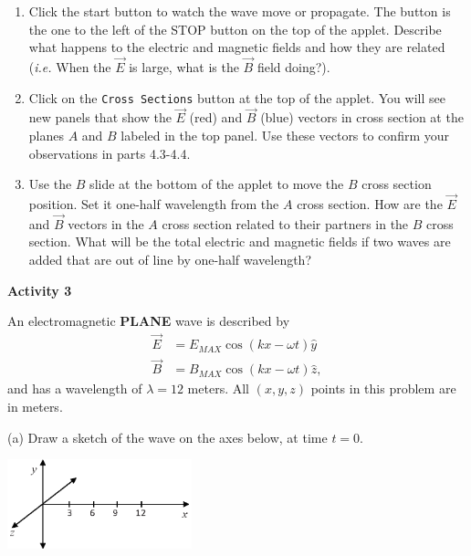 \begin{enumerate}
\item Click the start button to watch the wave move or propagate. The button is the one to the left of the STOP button on the top of the applet.
Describe what happens to the electric and magnetic fields and how they are related
({\it i.e.} When the $\vec E$ is large, what is the $\vec B$ field doing?).
\vspace{3.0cm}

\item Click on the {\tt Cross Sections} button at the top of the applet.
You will see new panels that show the $\vec E$ (red) and $\vec B$ (blue) vectors in cross section at the
planes $A$ and $B$ labeled in the top panel.
Use these vectors to confirm your observations in parts 4.3-4.4.
\vspace{3.0cm}

\item Use the $B$ slide at the bottom of the applet to move the $B$ cross 
section position.
Set it one-half wavelength from the $A$ cross section.
How are the $\vec E$ and $\vec B$ vectors in the $A$ cross section related to their partners 
in the $B$ cross section.
What will be the total electric and magnetic fields if two waves are added that are out of line
by one-half wavelength?
\vspace{3.0cm}

\end{enumerate}

\textbf{Activity 3}

An electromagnetic \textbf{PLANE} wave is described by
\begin{align*}
\vec E &= E_{MAX} \cos \left ( kx - \omega t \right ) \hat y\\
\vec B &= B_{MAX} \cos \left ( kx - \omega t \right ) \hat z,
\end{align*}
and has a wavelength of $\lambda =12$ meters.  All $(x,y,z)$ points in this problem are in meters.
\vspace{0.1in}

(a) Draw a sketch of the wave on the axes below, at time $t=0$.
\begin{center}
\includegraphics[width=0.4\textwidth]{plane_waves/em_waves_axes.eps}
\end{center}

